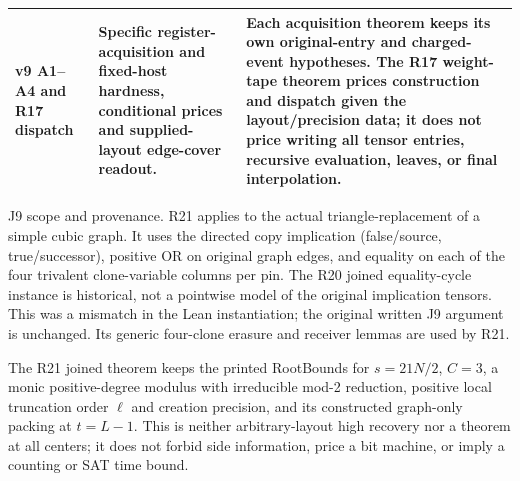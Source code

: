 \documentclass[
  11pt,
]{article}
\begin{document}
\begin{longtable}{@{}p{.14\linewidth}p{.31\linewidth}p{.49\linewidth}@{}}
v9 A1--A4 and R17 dispatch & Specific register-acquisition and fixed-host hardness, conditional prices and supplied-layout edge-cover readout. & Each acquisition theorem keeps its own original-entry and charged-event hypotheses. The R17 weight-tape theorem prices construction and dispatch given the layout/precision data; it does not price writing all tensor entries, recursive evaluation, leaves, or final interpolation. \\
\bottomrule
\end{longtable}

J9 scope and provenance. R21 applies to the actual triangle-replacement of a simple cubic graph. It uses the directed copy implication (false/source, true/successor), positive OR on original graph edges, and equality on each of the four trivalent clone-variable columns per pin. The R20 joined equality-cycle instance is historical, not a pointwise model of the original implication tensors. This was a mismatch in the Lean instantiation; the original written J9 argument is unchanged. Its generic four-clone erasure and receiver lemmas are used by R21.

The R21 joined theorem keeps the printed RootBounds for \(s=21N/2\), \(C=3\), a monic positive-degree modulus with irreducible mod-2 reduction, positive local truncation order \(\ell\) and creation precision, and its constructed graph-only packing at \(t=L-1\). This is neither arbitrary-layout high recovery nor a theorem at all centers; it does not forbid side information, price a bit machine, or imply a counting or SAT time bound.
\end{document}
